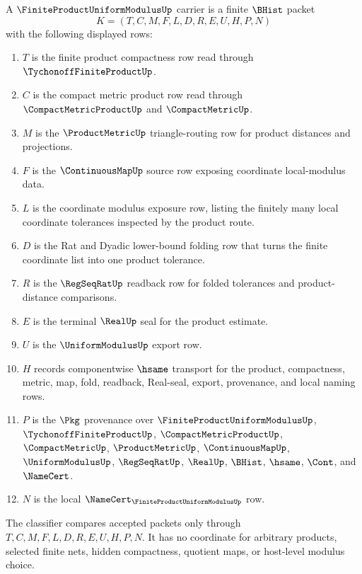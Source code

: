 \begin{definition}
\label{def:finite-product-uniform-modulus-carrier}
A $\FiniteProductUniformModulusUp$ carrier is a finite $\BHist$ packet
$$
K=(T,C,M,F,L,D,R,E,U,H,P,N)
$$
with the following displayed rows:
\begin{enumerate}
\item $T$ is the finite product compactness row read through $\TychonoffFiniteProductUp$.
\item $C$ is the compact metric product row read through $\CompactMetricProductUp$ and $\CompactMetricUp$.
\item $M$ is the $\ProductMetricUp$ triangle-routing row for product distances and projections.
\item $F$ is the $\ContinuousMapUp$ source row exposing coordinate local-modulus data.
\item $L$ is the coordinate modulus exposure row, listing the finitely many local coordinate tolerances inspected by the product route.
\item $D$ is the Rat and Dyadic lower-bound folding row that turns the finite coordinate list into one product tolerance.
\item $R$ is the $\RegSeqRatUp$ readback row for folded tolerances and product-distance comparisons.
\item $E$ is the terminal $\RealUp$ seal for the product estimate.
\item $U$ is the $\UniformModulusUp$ export row.
\item $H$ records componentwise $\hsame$ transport for the product, compactness, metric, map, fold, readback, Real-seal, export, provenance, and local naming rows.
\item $P$ is the $\Pkg$ provenance over $\FiniteProductUniformModulusUp$, $\TychonoffFiniteProductUp$, $\CompactMetricProductUp$, $\CompactMetricUp$, $\ProductMetricUp$, $\ContinuousMapUp$, $\UniformModulusUp$, $\RegSeqRatUp$, $\RealUp$, $\BHist$, $\hsame$, $\Cont$, and $\NameCert$.
\item $N$ is the local $\NameCert_{\FiniteProductUniformModulusUp}$ row.
\end{enumerate}
The classifier compares accepted packets only through $T,C,M,F,L,D,R,E,U,H,P,N$. It has no coordinate for arbitrary products, selected finite nets, hidden compactness, quotient maps, or host-level modulus choice.
\end{definition}

